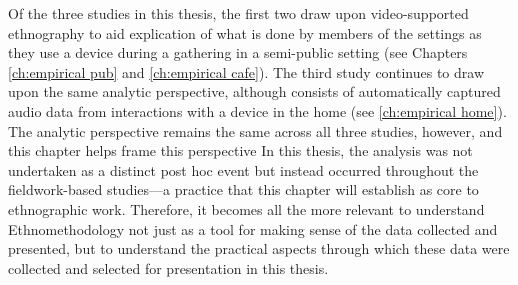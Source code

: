 Of the three studies in this thesis, the first two draw upon video-supported ethnography to aid explication of what is done by members of the settings as they use a device during a gathering in a semi-public setting (see Chapters \ref{ch:empirical pub} and \ref{ch:empirical cafe}).
The third study continues to draw upon the same analytic perspective, although consists of automatically captured audio data from interactions with a device in the home (see \autoref{ch:empirical home}).
The analytic perspective remains the same across all three studies, however, and this chapter helps frame this perspective 
In this thesis, the analysis was not undertaken as a distinct post hoc event but instead occurred throughout the fieldwork-based studies---a practice that this chapter will establish as core to ethnographic work.
Therefore, it becomes all the more relevant to understand Ethnomethodology not just as a tool for making sense of the data collected and presented, but to understand the practical aspects through which these data were collected and selected for presentation in this thesis.






